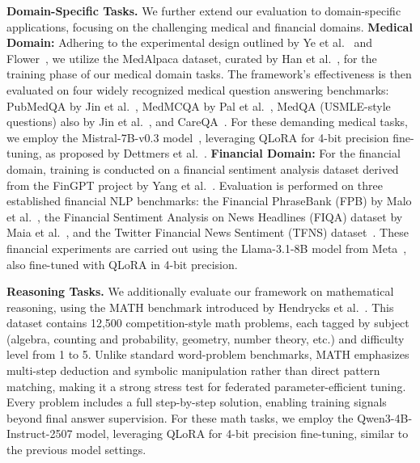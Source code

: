 \documentclass{article} %
\begin{document}
\noindent\textbf{Domain-Specific Tasks.}
We further extend our evaluation to domain-specific applications, focusing on the challenging medical and financial domains. \textbf{Medical Domain:} Adhering to the experimental design outlined by Ye et al.~\cite{ye2024openfedllm} and Flower~\cite{flower2024flowertune}, we utilize the MedAlpaca dataset, curated by Han et al.~\cite{han2023medalpaca}, for the training phase of our medical domain tasks. The framework's effectiveness is then evaluated on four widely recognized medical question answering benchmarks: PubMedQA by Jin et al.~\cite{jin2019pubmedqa}, MedMCQA by Pal et al.~\cite{pal2022medmcqa}, MedQA (USMLE-style questions) also by Jin et al.~\cite{jin2021disease}, and CareQA~\cite{arias2025automatic}. For these demanding medical tasks, we employ the Mistral-7B-v0.3 model~\cite{mistral7b2023}, leveraging QLoRA for 4-bit precision fine-tuning, as proposed by Dettmers et al.~\cite{dettmers2023qlora}. \textbf{Financial Domain:} For the financial domain, training is conducted on a financial sentiment analysis dataset derived from the FinGPT project by Yang et al.~\cite{fingpt2023dataset}. Evaluation is performed on three established financial NLP benchmarks: the Financial PhraseBank (FPB) by Malo et al.~\cite{malo2014good}, the Financial Sentiment Analysis on News Headlines (FIQA) dataset by Maia et al.~\cite{maia201818}, and the Twitter Financial News Sentiment (TFNS) dataset~\cite{twitter_financial_news_2022}. These financial experiments are carried out using the Llama-3.1-8B model from Meta~\cite{meta2024llama31}, also fine-tuned with QLoRA in 4-bit precision.

{\noindent\textbf{Reasoning Tasks.} We additionally evaluate our framework on mathematical reasoning, using the MATH benchmark introduced by Hendrycks et al.~\cite{hendrycksmath2021}. This dataset contains 12,500 competition-style math problems, each tagged by subject (algebra, counting and probability, geometry, number theory, etc.) and difficulty level from 1 to 5. Unlike standard word-problem benchmarks, MATH emphasizes multi-step deduction and symbolic manipulation rather than direct pattern matching, making it a strong stress test for federated parameter-efficient tuning. Every problem includes a full step-by-step solution, enabling training signals beyond final answer supervision. For these math tasks, we employ the Qwen3-4B-Instruct-2507 model, leveraging QLoRA for 4-bit precision fine-tuning, similar to the previous model settings.
}
\end{document}
